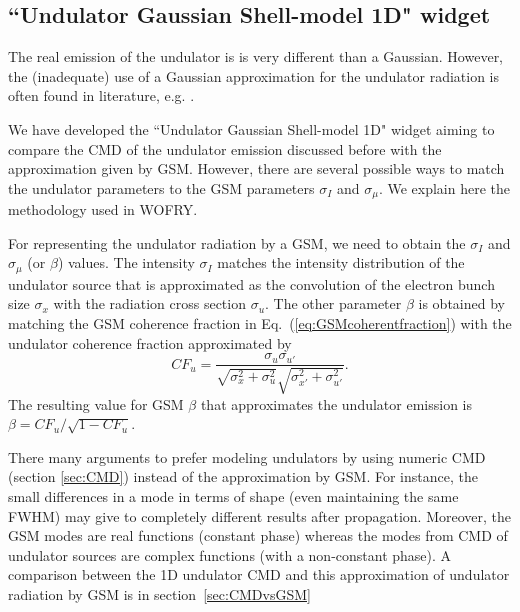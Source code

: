 \documentclass{iopconfser}
\newcommand{\todo}[1]{{\color{red}[TODO: "#1'']}}
\begin{document}
\subsection{``Undulator Gaussian Shell-model 1D" widget}
\label{sec:undulatorGSM}

The real emission of the undulator is is very different than a Gaussian. However, the (inadequate) use of a Gaussian approximation for the undulator radiation is often found in literature, e.g.  \cite{coisson1997}.

We have developed the ``Undulator Gaussian Shell-model 1D" widget
aiming to compare the CMD of the undulator emission discussed before with the approximation given by GSM. However, there are several possible ways to match the undulator parameters to the GSM parameters $\sigma_I$ and $\sigma_\mu$. We explain here the methodology used in WOFRY. 

For representing the undulator radiation by a GSM, we need to obtain the $\sigma_I$ and $\sigma_\mu$ (or $\beta$) values. The intensity $\sigma_I$ matches the intensity distribution of the undulator source that is approximated as the convolution of the electron bunch size $\sigma_x$ with the radiation cross section $\sigma_u$. The other parameter $\beta$ is obtained by matching the GSM coherence fraction in Eq.~(\ref{eq:GSMcoherentfraction}) with the undulator coherence fraction approximated by
\begin{equation}
    CF_u = \frac{\sigma_u\sigma_{u'}}{\sqrt{\sigma_x^2+\sigma_u^2}\sqrt{\sigma_{x'}^2+\sigma_{u'}^2}}.
\end{equation}
The resulting value for GSM $\beta$ that approximates the undulator emission is $\beta=CF_u/\sqrt{1-CF_u}$.

There many arguments to prefer modeling undulators by using numeric CMD (section \ref{sec:CMD}) instead of the approximation by GSM. For instance, the small differences in a mode in terms of shape (even maintaining the same FWHM) may give to completely different results after propagation. Moreover, the GSM modes are real functions (constant phase) whereas the modes from CMD of undulator sources are complex functions (with a non-constant phase). A comparison between the 1D undulator CMD and this approximation of  undulator radiation by GSM is in section~\ref{sec:CMDvsGSM}

\end{document}
